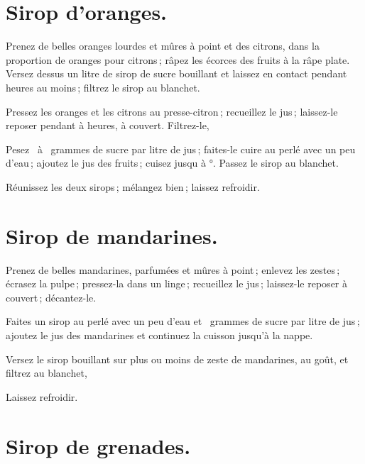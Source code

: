 \section*{\centering Sirop d'oranges.}
{}

Prenez de belles oranges lourdes et mûres à point et des citrons, dans la
proportion de {\mmm} oranges pour {\mmm} citrons ; râpez les écorces
des fruits à la râpe plate. Versez dessus un litre de sirop de sucre bouillant
et laissez en contact pendant {\mmm} heures au moins ; filtrez le sirop
au blanchet.

Pressez les oranges et les citrons au presse-citron ; recueillez le jus ;
laissez-le reposer pendant {\mmm} à {\mmm} heures, à couvert.
Filtrez-le,

Pesez {\mmm} {\mmm} à {\mmm} {\mmm} grammes de sucre
par litre de jus ; faites-le cuire au perlé avec un peu d'eau ; ajoutez le jus
des fruits ; cuisez jusqu à {\mmm}°. Passez le sirop au blanchet.

Réunissez les deux sirops ; mélangez bien ; laissez refroidir.

\section*{\centering Sirop de mandarines.}
{}

Prenez de belles mandarines, parfumées et mûres à point ; enlevez les zestes ;
écrasez la pulpe ; pressez-la dans un linge ; recueillez le jus ; laissez-le
reposer à couvert ; décantez-le.

Faites un sirop au perlé avec un peu d'eau et {\mmm} {\mmm} grammes
de sucre par litre de jus ; ajoutez le jus des mandarines et continuez la
cuisson jusqu'à la nappe.

Versez le sirop bouillant sur plus ou moins de zeste de mandarines, au goût,
et filtrez au blanchet,

Laissez refroidir.

\label{pg0988} \hypertarget{p0988}{}
\section*{\centering Sirop de grenades.}
{}

